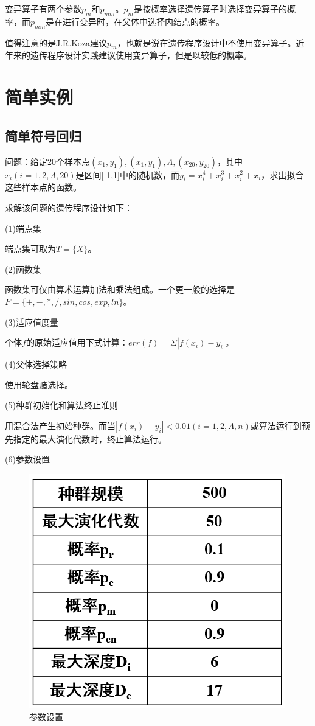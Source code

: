 \documentclass[UTF8]{ctexart}
\begin{document}
	变异算子有两个参数$p_{m}$和$p_{mm}$。$p_{m}$是按概率选择遗传算子时选择变异算子的概率，而$p_{mm}$是在进行变异时，在父体中选择内结点的概率。
	
	值得注意的是J.R.Koza建议$p_{m}$，也就是说在遗传程序设计中不使用变异算子。近年来的遗传程序设计实践建议使用变异算子，但是以较低的概率。

\section{简单实例}
\subsection{简单符号回归}
问题：给定20个样本点$(x_{1},y_{1}),(x_{1},y_{1}),\Lambda,(x_{20},y_{20})$，其中$x_{i}(i=1,2,\Lambda,20)$是区间[-1,1]中的随机数，而$y_{i}=x_{i}^{4}+x_{i}^{3}+x_{i}^{2}+x_{i}$，求出拟合这些样本点的函数。

  求解该问题的遗传程序设计如下：

  (1)端点集

  端点集可取为$T=\{X\}$。

  (2)函数集

  函数集可仅由算术运算加法和乘法组成。一个更一般的选择是$F=\{+,-,*,/,sin,cos,exp,ln\}$。

  (3)适应值度量

  个体$f$的原始适应值用下式计算：$err(f)=\Sigma|f(x_{i})-y_{i}|$。

  (4)父体选择策略

  使用轮盘赌选择。

  (5)种群初始化和算法终止准则

  用混合法产生初始种群。而当$|f(x_{i})-y_{i}|<0.01(i=1,2,\Lambda,n)$或算法运行到预先指定的最大演化代数时，终止算法运行。

  (6)参数设置
	\begin{figure}[ht]
		\centering	
		\includegraphics[scale=0.5]{images/parameter.png}
		\caption{参数设置}
		\label{fig:label}
	\end{figure}
\end{document}
